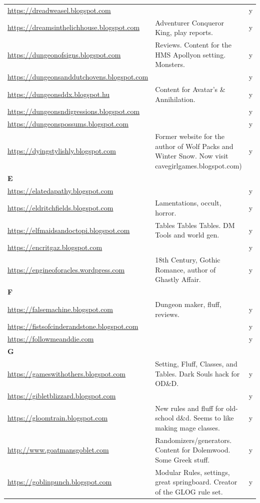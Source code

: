 \documentclass[a4paper, 11pt, twoside]{article}
\begin{document}
\begin{longtable}{p{6cm}p{8cm}c}
\url{https://dreadweasel.blogspot.com} &  & y\\
\url{https://dreamsinthelichhouse.blogspot.com} & Adventurer Conqueror King, play reports. & y\\
\url{https://dungeonofsigns.blogspot.com} & Reviews. Content for the HMS Apollyon setting. Monsters. & y\\
\url{https://dungeonsanddutchovens.blogspot.com} &  & y\\
\url{https://dungeonsddx.blogspot.hu} & Content for Avatar's \& Annihilation. & y\\
\url{https://dungeonsndigressions.blogspot.com} &  & y\\
\url{https://dungeonspossums.blogspot.com} &  & y\\
\url{https://dyingstylishly.blogspot.com} & Former website for the author of Wolf Packs and Winter Snow. Now visit cavegirlgames.blogspot.com) & y\\
\textbf{E} &  & \\
\url{https://elatedapathy.blogspot.com} &  & y\\
\url{https://eldritchfields.blogspot.com} & Lamentations, occult, horror. & y\\
\url{https://elfmaidsandoctopi.blogspot.com} & Tables Tables Tables. DM Tools and world gen. & y\\
\url{https://encritgaz.blogspot.com} &  & y\\
\url{https://engineoforacles.wordpress.com} & 18th Century, Gothic Romance, author of Ghastly Affair. & y\\
\textbf{F} &  & \\
\url{https://falsemachine.blogspot.com} & Dungeon maker, fluff, reviews. & y\\
\url{https://fistsofcinderandstone.blogspot.com} &  & y\\
\url{https://followmeanddie.com} &  & y\\
\textbf{G} &  & \\
\url{https://gameswithothers.blogspot.com} & Setting, Fluff, Classes, and Tables. Dark Souls hack for OD\&D. & y\\
\url{https://gibletblizzard.blogspot.com} &  & y\\
\url{https://gloomtrain.blogspot.com} & New rules and fluff for old-school d\&d. Seems to like making mage classes. & y\\
\url{http://www.goatmansgoblet.com} & Randomizers/generators. Content for Dolemwood. Some Greek stuff. & y\\
\url{https://goblinpunch.blogspot.com} & Modular Rules, settings, great springboard. Creator of the GLOG rule set. & y\\

\end{longtable}
\end{document}
